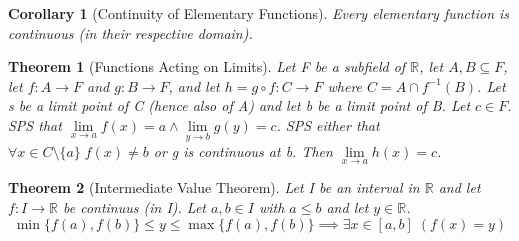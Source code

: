 \documentclass[11pt, oneside]{book}
\theoremstyle{break}
\newtheorem{thm}{Theorem}[section]
\newtheorem{crly}{Corollary}[thm]
\newcommand{\bb}[1]{\mathbb{#1}}			%
\begin{document}
\begin{crly}[Continuity of Elementary Functions]
	Every elementary function is continuous (in their respective domain).
\end{crly}

\begin{thm}[Functions Acting on Limits]
	Let F be a subfield of $\bb{R}$, let $A, B \subseteq F$, let $f: A \to F$ and $g: B \to F$, and let $h = g \circ f : C \to F$ where $C = A \cap f^{-1}(B)$. Let s be a limit point of C (hence also of A) and let b be a limit point of B. Let $c \in F$. SPS that $\lim\limits_{x \to a} f(x) = a \land \lim\limits_{y \to b} g(y) = c$. SPS either that $\forall x \in C \setminus \{a\} \; f(x) \neq b$ or g is continuous at b. Then $\lim\limits_{x \to a} h(x) = c$.
\end{thm}

\begin{thm}[Intermediate Value Theorem]
	Let I be an interval in $\bb{R}$ and let $f: I \to \bb{R}$ be continuus (in I). Let $a, b \in I$ with $a \leq b$ and let $y \in \bb{R}$.
	\begin{equation*}
		\min \{f(a), f(b)\} \leq y \leq \max \{f(a), f(b)\} \implies \exists x \in [a, b] \; (f(x) = y)
	\end{equation*}
\end{thm}
\end{document}
